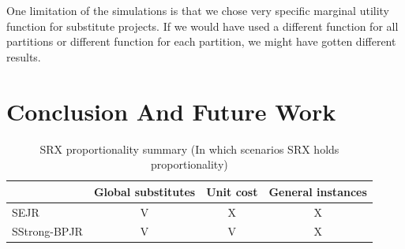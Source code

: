 \documentclass[runningheads]{llncs}
\newcommand{\kibitz}[2]{\ifnum\Comments=1{\color{#1}{#2}}\fi}
\newcommand{\rmr}[1]{\kibitz{red}{[Reshef says:#1]}}
\newcommand{\rf}[1]{\kibitz{blue}{[Roy says:#1]}}
\begin{document}






 
 One limitation of the simulations is that we chose very specific marginal utility function for substitute projects. If we would have used a different function for all partitions or different function for each partition, we might have gotten different results. %


\section{Conclusion And Future Work}

\vspace{-7mm}
\begin{table}[ht!]
  \begin{center}
    \begin{tabular}{l|c|c|c|}
      & Global substitutes & Unit cost & General instances\\
      \hline
      SEJR & V & X & X\\
      SStrong-BPJR & V & V & X\\
    \end{tabular}
    \caption{\label{tab:prop}SRX proportionality summary (In which scenarios SRX holds proportionality)}
  \end{center}
\end{table}
\vspace{-7mm}
\end{document}
